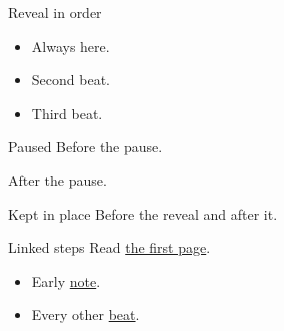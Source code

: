 \documentclass[aspectratio=169]{slides}
\begin{document}
\begin{frame}{Reveal in order}
\begin{itemize}
\item<1-> Always here.
\item<2-> Second beat.
\item<3-> Third beat.
\end{itemize}
\end{frame}

\begin{frame}{Paused}
Before the pause.

\pause
After the pause.
\end{frame}

\begin{frame}{Kept in place}
Before the reveal  and after it.
\end{frame}

\begin{frame}{Linked steps}
Read \href{https://example.org/first}{the first page}.
\begin{itemize}
\item<-2> Early \href{https://example.org/early}{note}.
\item<1,3> Every other \href{https://example.org/other}{beat}.
\end{itemize}
\end{frame}
\end{document}
